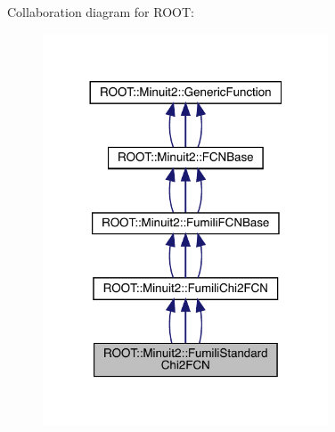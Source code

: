 Collaboration diagram for R\+O\+OT\+:
\nopagebreak
\begin{figure}[H]
\begin{center}
\leavevmode
\includegraphics[width=240pt]{da/db2/classROOT_1_1Minuit2_1_1FumiliStandardChi2FCN__coll__graph}
\end{center}
\end{figure}
